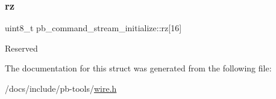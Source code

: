 \subsubsection{\texorpdfstring{rz}{rz}}
{\footnotesize\ttfamily uint8\+\_\+t pb\+\_\+command\+\_\+stream\+\_\+initialize\+::rz\mbox{[}16\mbox{]}}

Reserved 

The documentation for this struct was generated from the following file\+:\begin{DoxyCompactItemize}
\item 
/docs/include/pb-\/tools/\hyperlink{wire_8h}{wire.\+h}\end{DoxyCompactItemize}
